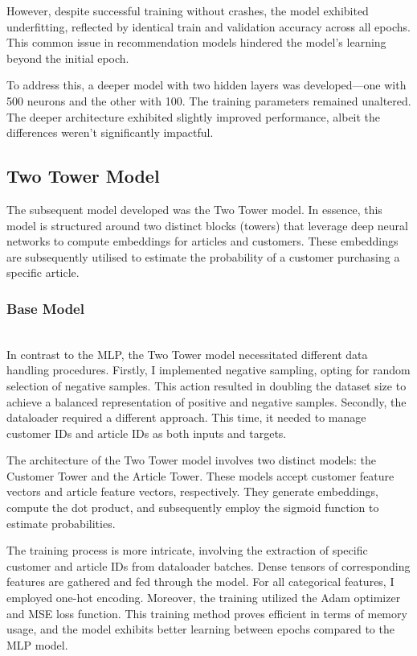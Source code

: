 \documentclass[conference,compsoc]{IEEEtran}
\begin{document}
However, despite successful training without crashes, the model exhibited underfitting, reflected by identical train and validation accuracy across all epochs. This common issue in recommendation models hindered the model's learning beyond the initial epoch.

To address this, a deeper model with two hidden layers was developed—one with 500 neurons and the other with 100. The training parameters remained unaltered. The deeper architecture exhibited slightly improved performance, albeit the differences weren't significantly impactful.

\subsection{Two Tower Model}
The subsequent model developed was the Two Tower model. In essence, this model is structured around two distinct blocks (towers) that leverage deep neural networks to compute embeddings for articles and customers. These embeddings are subsequently utilised to estimate the probability of a customer purchasing a specific article.

\subsubsection{Base Model}\mbox{}\\
In contrast to the MLP, the Two Tower model necessitated different data handling procedures. Firstly, I implemented negative sampling, opting for random selection of negative samples. This action resulted in doubling the dataset size to achieve a balanced representation of positive and negative samples. Secondly, the dataloader required a different approach. This time, it needed to manage customer IDs and article IDs as both inputs and targets.

The architecture of the Two Tower model involves two distinct models: the Customer Tower and the Article Tower. These models accept customer feature vectors and article feature vectors, respectively. They generate embeddings, compute the dot product, and subsequently employ the sigmoid function to estimate probabilities.

The training process is more intricate, involving the extraction of specific customer and article IDs from dataloader batches. Dense tensors of corresponding features are gathered and fed through the model. For all categorical features, I employed one-hot encoding. Moreover, the training utilized the Adam optimizer and MSE loss function. This training method proves efficient in terms of memory usage, and the model exhibits better learning between epochs compared to the MLP model.
\end{document}
